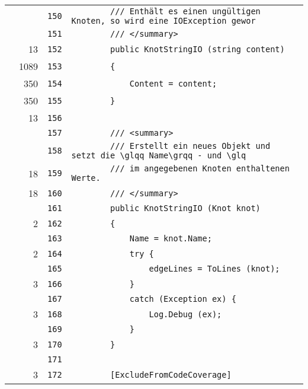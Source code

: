 \documentclass[a4paper,10pt]{article}
\begin{document}
\begin{longtable}[l]{lrrl}
\cellcolor{gray} &  & \verb~150~ & \verb~        /// Enthält es einen ungültigen Knoten, so wird eine IOException gewor~\\
\cellcolor{gray} &  & \verb~151~ & \verb~        /// </summary>~\\
\cellcolor{green} & 13 & \verb~152~ & \verb~        public KnotStringIO (string content)~\\
\cellcolor{green} & 1089 & \verb~153~ & \verb~        {~\\
\cellcolor{green} & 350 & \verb~154~ & \verb~            Content = content;~\\
\cellcolor{green} & 350 & \verb~155~ & \verb~        }~\\
\cellcolor{green} & 13 & \verb~156~ & \verb~~\\
\cellcolor{gray} &  & \verb~157~ & \verb~        /// <summary>~\\
\cellcolor{gray} &  & \verb~158~ & \verb~        /// Erstellt ein neues Objekt und setzt die \glqq Name\grqq - und \glq~\\
\cellcolor{green} & 18 & \verb~159~ & \verb~        /// im angegebenen Knoten enthaltenen Werte.~\\
\cellcolor{green} & 18 & \verb~160~ & \verb~        /// </summary>~\\
\cellcolor{gray} &  & \verb~161~ & \verb~        public KnotStringIO (Knot knot)~\\
\cellcolor{green} & 2 & \verb~162~ & \verb~        {~\\
\cellcolor{gray} &  & \verb~163~ & \verb~            Name = knot.Name;~\\
\cellcolor{green} & 2 & \verb~164~ & \verb~            try {~\\
\cellcolor{gray} &  & \verb~165~ & \verb~                edgeLines = ToLines (knot);~\\
\cellcolor{green} & 3 & \verb~166~ & \verb~            }~\\
\cellcolor{gray} &  & \verb~167~ & \verb~            catch (Exception ex) {~\\
\cellcolor{green} & 3 & \verb~168~ & \verb~                Log.Debug (ex);~\\
\cellcolor{gray} &  & \verb~169~ & \verb~            }~\\
\cellcolor{green} & 3 & \verb~170~ & \verb~        }~\\
\cellcolor{gray} &  & \verb~171~ & \verb~~\\
\cellcolor{green} & 3 & \verb~172~ & \verb~        [ExcludeFromCodeCoverage]~\\

\end{longtable}
\end{document}

